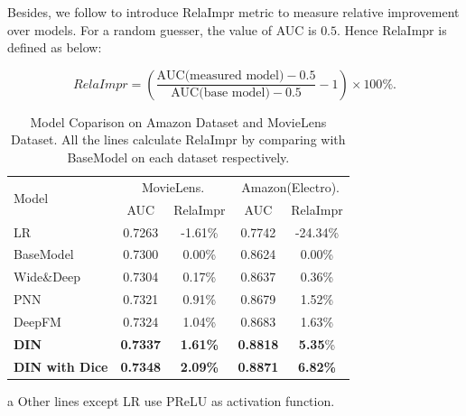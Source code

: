 Besides, we follow \cite{yan2014coupled} to introduce RelaImpr metric to measure relative improvement over models. For a random guesser, the value of AUC is $0.5$. Hence RelaImpr is defined as below: 
\begin{small}
\begin{equation}
RelaImpr = \left(\frac{\text{AUC(measured model)} -0.5}{\text{AUC(base model)} - 0.5} - 1\right) \times 100\%.
\end{equation}
\end{small}



\begin{table}[]
\caption{Model Coparison on Amazon Dataset and MovieLens Dataset. All the lines calculate RelaImpr by comparing with BaseModel on each dataset respectively.}
\centering
\begin{threeparttable}
\begin{tabular}{lcccc}
\toprule
\multirow{2}{*}{Model}  & \multicolumn{2}{c}{MovieLens.} & \multicolumn{2}{c}{Amazon(Electro).}  \\ 
& AUC & RelaImpr & AUC & RelaImpr \\ \midrule
LR  & 0.7263 & -1.61\% & 0.7742 & -24.34\%  \\
BaseModel & 0.7300 & 0.00\% & 0.8624 & 0.00\%  \\
Wide\&Deep & 0.7304 & 0.17\% & 0.8637 & 0.36\%  \\
PNN  & 0.7321 & 0.91\% & 0.8679 & 1.52\%  \\
DeepFM  & 0.7324 & 1.04\% & 0.8683 & 1.63\% \\
\textbf{DIN} & \textbf{0.7337} & \textbf{1.61\%} & \textbf{0.8818} & \textbf{5.35}\%\\
\textbf{DIN with Dice}\tnote{a} & \textbf{0.7348} & \textbf{2.09\%} & \textbf{0.8871} & \textbf{6.82\%} \\ \bottomrule
\end{tabular}
\begin{tablenotes}%
        \item[a] Other lines except LR use PReLU as activation function.
      \end{tablenotes}
      \end{threeparttable}
\label{table:exptablePublic}
\end{table}
\vspace*{-0.4cm}





